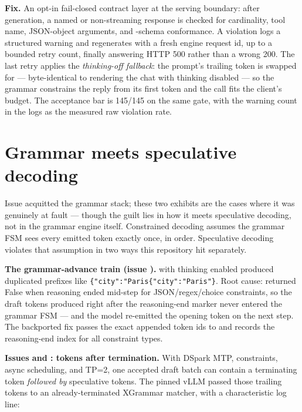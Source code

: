 \textbf{Fix.} An opt-in fail-closed contract layer at the serving boundary:
after generation, a named or  non-streaming response is checked
for cardinality, tool name, JSON-object arguments, and -schema
conformance. A violation logs a structured warning and regenerates with a
fresh engine request id, up to a bounded retry count, finally answering
HTTP 500 rather than a wrong 200. The last retry applies the
\emph{thinking-off fallback}: the prompt's trailing  token is
swapped for  --- byte-identical to rendering the chat with
thinking disabled --- so the grammar constrains the reply from its first token
and the call fits the client's budget. The acceptance bar is 145/145 on the
same gate, with the warning count in the logs as the measured raw violation
rate.

\section{Grammar meets speculative decoding}
\label{sec:bugs-grammar}

Issue  acquitted the grammar stack; these two exhibits are the
cases where it was genuinely at fault --- though the guilt lies in how it
meets speculative decoding, not in the grammar engine itself. Constrained
decoding assumes the grammar FSM sees every emitted token exactly
once, in order. Speculative decoding violates that assumption in two ways this
repository hit separately.

\textbf{The  grammar-advance train (issue ).}
 with thinking enabled produced duplicated
prefixes like \texttt{\{"city":"Paris\{"city":"Paris"\}}. Root cause:
 returned False when reasoning ended mid-step for
JSON/regex/choice constraints, so the draft tokens produced right after the
reasoning-end marker never entered the grammar FSM --- and the model re-emitted
the opening token on the next step. The backported fix passes the exact
appended token ids to  and records the reasoning-end
index for all constraint types.

\textbf{Issues  and : tokens after termination.}
With DSpark MTP,  constraints, async scheduling, and
TP=2, one accepted draft batch can contain a terminating token \emph{followed
by} speculative tokens. The pinned vLLM passed those trailing tokens to an
already-terminated XGrammar matcher, with a characteristic log line:

